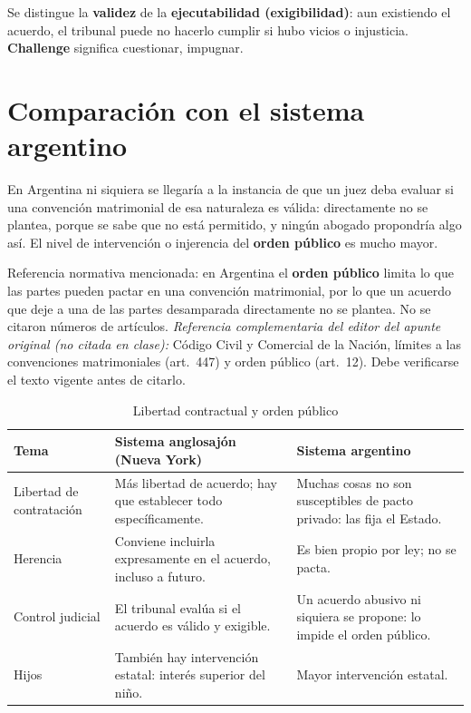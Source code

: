 \documentclass[12pt,oneside]{book}
\begin{document}
\begin{important}
Se distingue la \textbf{validez} de la \textbf{ejecutabilidad (exigibilidad)}: aun existiendo el acuerdo, el tribunal puede no hacerlo cumplir si hubo vicios o injusticia. \textbf{Challenge} significa cuestionar, impugnar.
\end{important}

\section{Comparación con el sistema argentino}

En Argentina ni siquiera se llegaría a la instancia de que un juez deba evaluar si una convención matrimonial de esa naturaleza es válida: directamente no se plantea, porque se sabe que no está permitido, y ningún abogado propondría algo así. El nivel de intervención o injerencia del \textbf{orden público} es mucho mayor.

\begin{note}
Referencia normativa mencionada: en Argentina el \textbf{orden público} limita lo que las partes pueden pactar en una convención matrimonial, por lo que un acuerdo que deje a una de las partes desamparada directamente no se plantea. No se citaron números de artículos. \textit{Referencia complementaria del editor del apunte original (no citada en clase):} Código Civil y Comercial de la Nación, límites a las convenciones matrimoniales (art.~447) y orden público (art.~12). Debe verificarse el texto vigente antes de citarlo.
\end{note}

\begin{table}[H]
\centering
\caption{Libertad contractual y orden público}
\begin{tabularx}{\textwidth}{@{}>{\raggedright\arraybackslash}p{}YY@{}}
\toprule
\textbf{Tema} & \textbf{Sistema anglosajón (Nueva York)} & \textbf{Sistema argentino} \\
\midrule
Libertad de contratación & Más libertad de acuerdo; hay que establecer todo específicamente. & Muchas cosas no son susceptibles de pacto privado: las fija el Estado. \\
Herencia & Conviene incluirla expresamente en el acuerdo, incluso a futuro. & Es bien propio por ley; no se pacta. \\
Control judicial & El tribunal evalúa si el acuerdo es válido y exigible. & Un acuerdo abusivo ni siquiera se propone: lo impide el orden público. \\
Hijos & También hay intervención estatal: interés superior del niño. & Mayor intervención estatal. \\
\bottomrule
\end{tabularx}
\end{table}
\end{document}

